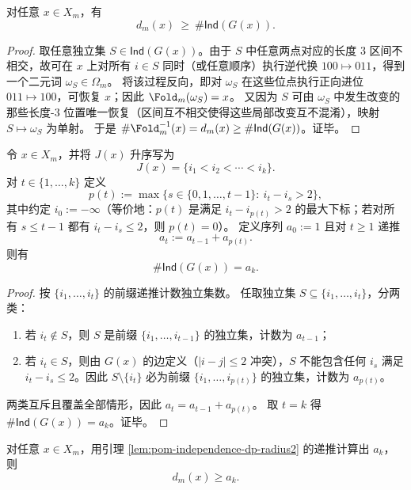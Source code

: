 \begin{lemma}[自由逆代换给出的纤维下界]\label{lem:pom-fiber-lower-bound-independent-sets}
对任意 $x\in X_m$，有
\[
d_m(x)\ \ge\ \#\mathsf{Ind}(G(x)).
\]
\end{lemma}

\begin{proof}
取任意独立集 $S\in\mathsf{Ind}(G(x))$。由于 $S$ 中任意两点对应的长度 $3$ 区间不相交，故可在 $x$ 上对所有 $i\in S$ 同时（或任意顺序）执行逆代换 $100\mapsto 011$，得到一个二元词 $\omega_S\in\Omega_m$。
将该过程反向，即对 $\omega_S$ 在这些位点执行正向进位 $011\mapsto 100$，可恢复 $x$；因此 $\Fold_m(\omega_S)=x$。
又因为 $S$ 可由 $\omega_S$ 中发生改变的那些长度-$3$ 位置唯一恢复（区间互不相交使得这些局部改变互不混淆），映射 $S\mapsto \omega_S$ 为单射。
于是 $\#\Fold_m^{-1}(x)=d_m(x)\ge \#\mathsf{Ind}(G(x))$。证毕。
\end{proof}

\begin{lemma}[独立集计数的线性时间递推（半径 2 冲突）]\label{lem:pom-independence-dp-radius2}
令 $x\in X_m$，并将 $J(x)$ 升序写为
\[
J(x)=\{i_1<i_2<\cdots<i_k\}.
\]
对 $t\in\{1,\dots,k\}$ 定义
\[
p(t):=\max\{s\in\{0,1,\dots,t-1\}:\ i_t-i_s>2\},
\]
其中约定 $i_0:=-\infty$（等价地：$p(t)$ 是满足 $i_t-i_{p(t)}>2$ 的最大下标；若对所有 $s\le t-1$ 都有 $i_t-i_s\le 2$，则 $p(t)=0$）。
定义序列 $a_0:=1$ 且对 $t\ge 1$ 递推
\[
a_t:=a_{t-1}+a_{p(t)}.
\]
则有
\[
\#\mathsf{Ind}(G(x))=a_k.
\]
\end{lemma}

\begin{proof}
按 $\{i_1,\dots,i_t\}$ 的前缀递推计数独立集数。
任取独立集 $S\subseteq\{i_1,\dots,i_t\}$，分两类：
\begin{enumerate}
  \item 若 $i_t\notin S$，则 $S$ 是前缀 $\{i_1,\dots,i_{t-1}\}$ 的独立集，计数为 $a_{t-1}$；
  \item 若 $i_t\in S$，则由 $G(x)$ 的边定义（$|i-j|\le 2$ 冲突），$S$ 不能包含任何 $i_s$ 满足 $i_t-i_s\le 2$。因此 $S\setminus\{i_t\}$ 必为前缀 $\{i_1,\dots,i_{p(t)}\}$ 的独立集，计数为 $a_{p(t)}$。
\end{enumerate}
两类互斥且覆盖全部情形，因此 $a_t=a_{t-1}+a_{p(t)}$。
取 $t=k$ 得 $\#\mathsf{Ind}(G(x))=a_k$。证毕。
\end{proof}

\begin{corollary}[一个可计算的纤维下界]\label{cor:pom-fiber-lower-bound-dp}
对任意 $x\in X_m$，用引理 \ref{lem:pom-independence-dp-radius2} 的递推计算出 $a_k$，则
\[
d_m(x)\ge a_k.
\]
\end{corollary}

